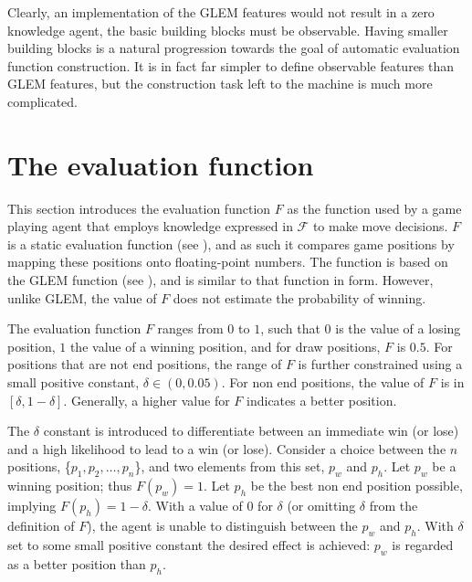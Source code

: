 
Clearly, an implementation of the GLEM features would not result in a zero knowledge agent,  the basic building blocks must be observable.   Having smaller building blocks is a natural progression towards the goal of automatic evaluation function construction.  It is in fact far simpler to define observable features than GLEM features, but the construction task left to the machine is much more complicated.  

\section{The evaluation function}
\label{sec:knowledge-function}
This section introduces the evaluation function $F$ as the function used by a game playing agent that employs knowledge expressed in $\mathcal{F}$ to make move decisions. $F$ is a static evaluation function (see ), and as such it compares game positions by mapping these positions onto floating-point numbers.  The function is based on the GLEM function (see ), and is similar to that function in form.  However, unlike GLEM, the value of $F$ does not estimate the probability of winning.

The evaluation function $F$ ranges from $0$ to $1$, such that $0$ is the value of a losing position,  $1$ the value of a winning position, and for draw positions, $F$ is $0.5$.  For positions that are not end positions, the range of $F$ is further constrained using a small positive constant, $\delta \in (0,0.05)$.  
For non end positions, the value of $F$ is in $[\delta,1-\delta]$. Generally, a higher value for $F$ indicates a better position.

The $\delta$ constant is introduced to differentiate between an immediate win (or lose) and a high likelihood to lead to a win (or lose). Consider a choice between the  $n$ positions, \{$p_1,p_2,\ldots,p_n$\}, and two elements from this set, $p_w$ and $p_h$. Let  $p_w$ be a winning position; thus  $F(p_w) = 1$. Let $p_h$ be the best non end position possible, implying $F(p_h) = 1 - \delta$.  With a value of $0$  for $\delta$ (or omitting $\delta$ from the definition of $F$), the agent is unable to distinguish between the $p_w$ and $p_h$.  With $\delta$ set to some small positive constant the desired effect is achieved:  $p_w$ is regarded as a better position than $p_h$.

